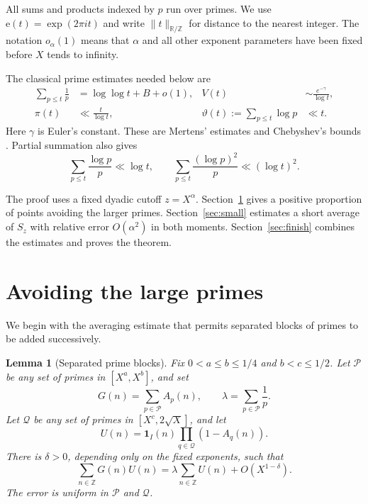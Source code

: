 \documentclass[11pt,reqno]{amsart}
\newtheorem{lemma}[theorem]{Lemma}
\theoremstyle{remark}
\numberwithin{equation}{section}
\newcommand{\Z}{\mathbb Z}
\newcommand{\R}{\mathbb R}
\newcommand{\ind}{\mathbf 1}
\begin{document}
All sums and products indexed by $p$ run over primes. We use
$\mathrm e(t)=\exp(2\pi i t)$ and write $\|t\|_{\R/\Z}$ for distance
to the nearest integer. The notation $o_\alpha(1)$ means that $\alpha$
and all other exponent parameters have been fixed before $X$ tends
to infinity.

The classical prime estimates needed below are
\begin{align}
 \sum_{p\leq t}\frac1p&=\log\log t+B+o(1),&
 V(t)&\sim\frac{e^{-\gamma}}{\log t},\label{eq:mertens}\\
 \pi(t)&\ll\frac{t}{\log t},&
 \vartheta(t):=\sum_{p\leq t}\log p&\ll t.\label{eq:cheb}
\end{align}
Here $\gamma$ is Euler's constant. These are Mertens' estimates and Chebyshev's bounds
\cite{Mertens,Chebyshev}. Partial summation also gives
\begin{equation}\label{eq:logmoments}
 \sum_{p\leq t}\frac{\log p}{p}\ll\log t,
 \qquad
 \sum_{p\leq t}\frac{(\log p)^2}{p}\ll(\log t)^2.
\end{equation}

The proof uses a fixed dyadic cutoff $z=X^\alpha$.
Section~\ref{sec:large} gives a positive proportion of points avoiding
the larger primes. Section~\ref{sec:small} estimates a short average
of $S_z$ with relative error $O(\alpha^2)$ in both moments.
Section~\ref{sec:finish} combines the estimates and proves the theorem.

\section{Avoiding the large primes}\label{sec:large}

We begin with the averaging estimate that permits separated blocks of
primes to be added successively.

\begin{lemma}[Separated prime blocks]\label{lem:blocks}
Fix $0<a\leq b\leq1/4$ and $b<c\leq1/2$.
Let $\mathcal P$ be any set of primes in $[X^a,X^b]$, and set
\[
 G(n)=\sum_{p\in\mathcal P}A_p(n),\qquad
 \lambda=\sum_{p\in\mathcal P}\frac1p.
\]
Let $\mathcal Q$ be any set of primes in $[X^c,2\sqrt X]$, and let
\[
 U(n)=\ind_I(n)\prod_{q\in\mathcal Q}(1-A_q(n)).
\]
There is $\delta>0$, depending only on the fixed exponents, such that
\begin{equation}\label{eq:correlation}
 \sum_{n\in\Z}G(n)U(n)
 =\lambda\sum_{n\in\Z}U(n)+O(X^{1-\delta}).
\end{equation}
The error is uniform in $\mathcal P$ and $\mathcal Q$.
\end{lemma}
\end{document}
